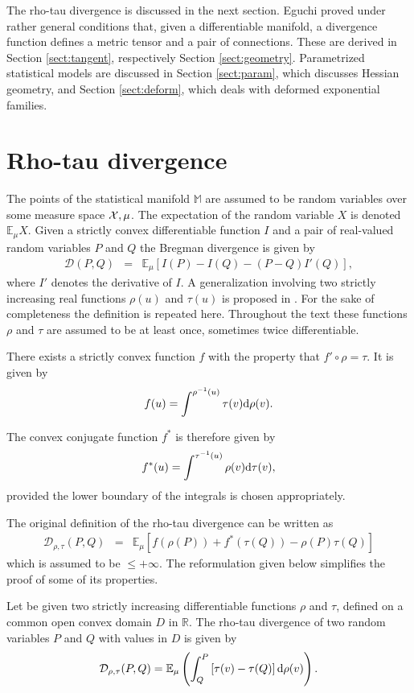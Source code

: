 \documentclass[graybox]{svmult}
\newcommand{\be}{\begin{equation}}
\newcommand{\ee}{\end{equation}}
\newcommand{\beq}{\begin{eqnarray}}
\newcommand{\eeq}{\end{eqnarray}}
\newcommand{\Mo}{\mathbb M}
\newcommand{\Eo}{\mathbb E}
\newcommand{\Ro}{\mathbb R}
\newcommand{\Ddiv}{\mathcal{D}}
\newcommand{\upd}{{\rm d}}
\begin{document}
The rho-tau divergence is discussed in the next section. Eguchi \cite{eguchi1983,eguchi1985}
proved under rather general conditions that, given a differentiable manifold,
a divergence function defines a metric tensor and a pair of connections.
These are derived in Section \ref{sect:tangent}, respectively Section \ref{sect:geometry}.
Parametrized statistical models are discussed in Section \ref{sect:param}, which
discusses Hessian geometry, and Section \ref{sect:deform}, which deals with deformed
exponential families.


\section{Rho-tau divergence}
\label{sect:rhotau}


The points of the statistical manifold $\Mo$ are assumed to be random variables over some measure space ${\cal X}, \mu$.
The expectation of the random variable $X$ is denoted $\Eo_\mu X$.
Given a strictly convex differentiable function $I$ and a pair of real-valued
random variables $P$ and $Q$ the Bregman divergence \cite{bregman1967}
is given by
\beq
\Ddiv (P,Q)&=&\Eo_\mu\left[ I(P)-I(Q)-(P-Q)I'(Q)\right],
\label{div:breg}
\eeq
where $I'$ denotes the derivative of $I$.
A generalization involving two strictly increasing real functions $\rho(u)$ and $\tau(u)$
is proposed in \cite {zhang2004a}. For the sake of completeness the definition is repeated here.
Throughout the text these functions $\rho$ and $\tau$ are assumed to be at least once,
sometimes twice differentiable.


There exists a strictly convex function $f$ with the property that $f'\circ \rho=\tau$.
It is given by
\be
\label{div:f}
f(u)=\int^{\rho^{-1}(u)} \tau(v)\upd \rho(v).
\ee

The convex conjugate function $f^*$ is therefore given by
\be
f^*(u)=\int^{\tau^{-1}(u)}\rho(v)\upd\tau(v),
\label{div:fstar}
\ee
provided the lower boundary of the integrals is chosen appropriately.

The original definition \cite{zhang2004a} of the rho-tau divergence can be written as
\beq
\Ddiv _{\rho,\tau}(P,Q)&=&\Eo_\mu\left[
f(\rho(P))+f^*(\tau(Q))-\rho(P)\tau(Q)\right]
\label{div:rhotaudivzhang}
\eeq
which is assumed to be $\le +\infty.$ The reformulation given below simplifies the proof of some of its properties.

\begin{definition}
Let be given two strictly increasing differentiable functions $\rho$ and $\tau$,
defined on a common open convex domain $D$ in $\Ro$.
The rho-tau divergence  of two random variables $P$ and $Q$ with values in $D$ is given by
\be
\Ddiv _{\rho,\tau}(P,Q)=\Eo_\mu\left(\int_Q^P\left[\tau(v)-\tau(Q)\right]\upd \rho(v)\right).
\label{div:rhotaudiv}
\ee
\end{definition}
\end{document}
